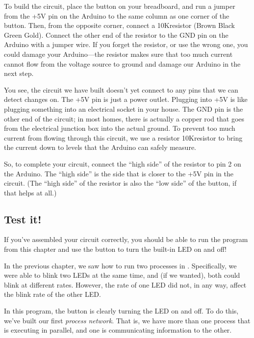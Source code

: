 To build the circuit, place the button on your breadboard, and run a jumper from the {\code +5V} pin on the Arduino to the same column as one corner of the button. Then, from the opposite corner, connect a 10K\ohm resistor (Brown Black Green Gold). Connect the other end of the resistor to the {\code GND} pin on the Arduino with a jumper wire. If you forget the resistor, or use the wrong one, you could damage your Arduino---the resistor makes sure that too much current cannot flow from the voltage source to ground and damage our Arduino in the next step.

You see, the circuit we have built doesn't yet connect to any pins that we can detect changes on. The {\code +5V} pin is just a power outlet. Plugging into {\code +5V} is like plugging something into an electrical socket in your house. The {\code GND} pin is the other end of the circuit; in most homes, there is actually a copper rod that goes from the electrical junction box into the actual ground. To prevent too much current from flowing through this circuit, we use a resistor 10K\ohm resistor to bring the current down to levels that the Arduino can safely measure.

So, to complete your circuit, connect the ``high side'' of the resistor to pin 2 on the Arduino. The ``high side'' is the side that is closer to the {\code +5V} pin in the circuit. (The ``high side'' of the resistor is also the ``low side'' of the button, if that helps at all.)

\subsection{Test it!}
If you've assembled your circuit correctly, you should be able to run the program from this chapter and use the button to turn the built-in LED on and off!

\PATTERNS
In the previous chapter, we saw how to run two processes in \PARallel. Specifically, we were able to blink two LEDs at the same time, and (if we wanted), both could blink at different rates. However, the rate of one LED did not, in any way, affect the blink rate of the other LED.

In this program, the button is clearly turning the LED on and off. To do this, we've built our first {\em process network}. That is, we have more than one process that is executing in parallel, and one is communicating information to the other.

